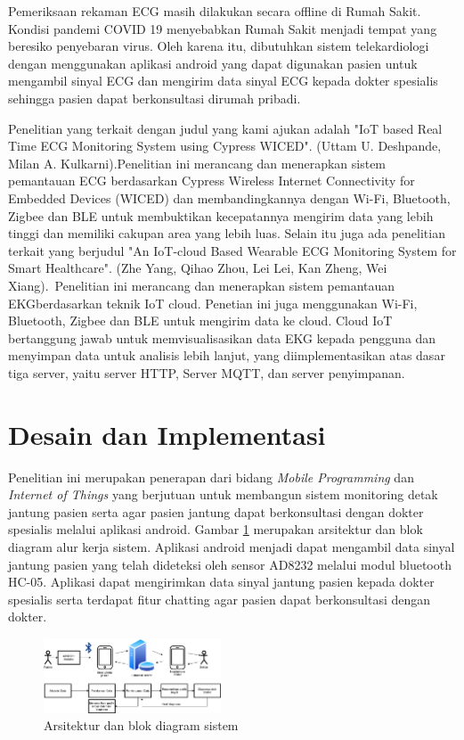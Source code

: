 \documentclass[conference]{IEEEtran}
\begin{document}
	\vspace{1ex}
	
	Pemeriksaan rekaman ECG masih dilakukan secara offline di Rumah Sakit. Kondisi pandemi COVID 19 menyebabkan Rumah Sakit menjadi tempat yang beresiko penyebaran virus. Oleh karena itu, dibutuhkan sistem telekardiologi dengan menggunakan aplikasi android yang dapat digunakan pasien untuk mengambil sinyal ECG dan mengirim data sinyal ECG kepada dokter spesialis sehingga pasien dapat berkonsultasi dirumah pribadi.
	
	\vspace{1ex} 
	
	 Penelitian yang terkait dengan judul yang kami ajukan adalah "IoT based Real Time ECG Monitoring System
	using Cypress WICED". (Uttam U. Deshpande, Milan A. Kulkarni)\cite{cit:4}.Penelitian ini merancang dan menerapkan sistem pemantauan ECG berdasarkan Cypress Wireless Internet Connectivity for Embedded Devices (WICED) dan membandingkannya dengan  Wi-Fi, Bluetooth, Zigbee dan BLE untuk membuktikan kecepatannya mengirim data yang lebih tinggi dan memiliki cakupan area yang lebih luas. Selain itu juga ada penelitian terkait yang berjudul "An IoT-cloud Based Wearable ECG Monitoring System
	for Smart Healthcare". (Zhe Yang, Qihao Zhou, Lei Lei, Kan Zheng, Wei Xiang)\cite{cit:5}.\ Penelitian ini merancang dan menerapkan sistem pemantauan EKGberdasarkan teknik IoT cloud. Penetian ini juga menggunakan Wi-Fi, Bluetooth, Zigbee dan BLE untuk mengirim data ke cloud. Cloud IoT bertanggung jawab untuk memvisualisasikan data EKG kepada pengguna dan menyimpan data untuk analisis lebih lanjut, yang diimplementasikan atas dasar tiga server, yaitu server HTTP, Server MQTT, dan server penyimpanan.
	
	\section{Desain dan Implementasi}
	\vspace{1ex}
	Penelitian ini merupakan penerapan dari bidang \textit{Mobile Programming} dan \textit{Internet of Things} yang berjutuan untuk membangun sistem monitoring detak jantung pasien serta agar pasien jantung dapat berkonsultasi dengan dokter spesialis melalui aplikasi android. Gambar \ref{Gambar:1} merupakan arsitektur dan blok diagram alur kerja sistem. Aplikasi android menjadi dapat mengambil data sinyal jantung pasien yang telah dideteksi oleh sensor AD8232 melalui modul bluetooth HC-05. Aplikasi dapat mengirimkan data sinyal jantung pasien kepada dokter spesialis serta terdapat fitur chatting agar pasien dapat berkonsultasi dengan dokter. 
	\vspace{1ex}
	\begin{figure}[!ht] \centering
		\includegraphics[width=0.47\textwidth]{img/arsitektur.png}
		\caption{Arsitektur dan blok diagram sistem}
		\label{Gambar:1}
	\end{figure}
	\vspace{1ex}
	
\end{document}
